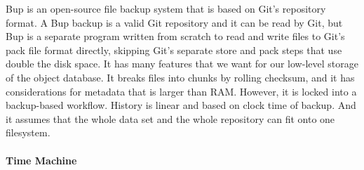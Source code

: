 Bup \cite{bup_homepage} is an open-source file backup system that is based on
Git's repository format. A Bup backup is a valid Git repository and it can be
read by Git, but Bup is a separate program written from scratch to read and
write files to Git's pack file format directly, skipping Git's separate store
and pack steps that use double the disk space. It has many features that we want
for our low-level storage of the object database. It breaks files into chunks by
rolling checksum, and it has considerations for metadata that is larger than
RAM. However, it is locked into a backup-based workflow. History is linear and
based on clock time of backup. And it assumes that the whole data set and the
whole repository can fit onto one filesystem.


\paragraph{Time Machine}

